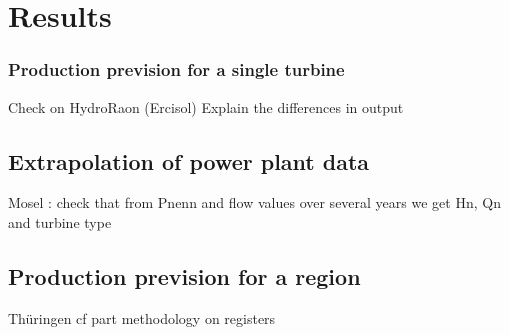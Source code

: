\chapter{Results}

\subsection{Production prevision for a single turbine}
Check on HydroRaon (Ercisol) \newline
Explain the differences in output


\section{Extrapolation of power plant data}
\label{missing_data}
Mosel : check that from Pnenn and flow values over several years we get Hn, Qn and turbine type

\section{Production prevision for a region}
Thüringen cf part methodology on registers